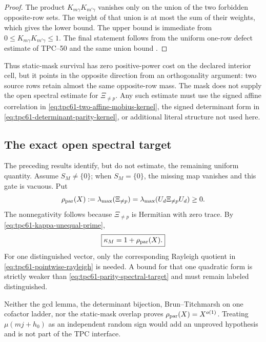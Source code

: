 \begin{proof}
The product \(K_{m\gamma}K_{m'\gamma}\) vanishes only on the union of
the two forbidden opposite-row sets.  The weight of that union is at most
the sum of their weights, which gives the lower bound.  The upper bound is
immediate from \(0\le K_{m\gamma}K_{m'\gamma}\le1\).  The final statement
follows from the uniform one-row defect estimate of TPC--50 and the same
union bound \citep{WangTPC50}.
\end{proof}

Thus static-mask survival has zero positive-power cost on the declared
interior cell, but it points in the opposite direction from an orthogonality
argument: two source rows retain almost the same opposite-row mass.  The
mask does not supply the open spectral estimate for
\(\Xi_{\ne p}\).  Any such estimate must use the signed affine correlation
in \eqref{eq:tpc61-two-affine-mobius-kernel}, the signed determinant form
in \eqref{eq:tpc61-determinant-parity-kernel}, or additional literal
structure not used here.

\subsection{The exact open spectral target}

The preceding results identify, but do not estimate, the remaining
uniform quantity.  Assume \(S_M\ne\{0\}\); when \(S_M=\{0\}\), the
missing map vanishes and this gate is vacuous.  Put
\begin{equation}
 \rho_{\rm par}(X)
 :=\lambda_{\max}(\Xi_{\ne p})
 =\lambda_{\max}(U_d\Xi_{\ne p}U_d)\ge0.
 \label{eq:tpc61-parity-spectral-target}
\end{equation}
The nonnegativity follows because \(\Xi_{\ne p}\) is Hermitian with zero
trace.  By
\eqref{eq:tpc61-kappa-unequal-prime},
\begin{equation}
 \boxed{\kappa_M=1+\rho_{\rm par}(X).}
 \label{eq:tpc61-kappa-parity-target}
\end{equation}
For one distinguished vector, only the corresponding Rayleigh quotient in
\eqref{eq:tpc61-pointwise-rayleigh} is needed.  A bound for that one
quadratic form is strictly weaker than
\eqref{eq:tpc61-parity-spectral-target} and must remain labeled
distinguished.

Neither the gcd lemma, the determinant bijection, Brun--Titchmarsh on one
cofactor ladder, nor the static-mask overlap proves
\(\rho_{\rm par}(X)=X^{o(1)}\).  Treating
\(\mu(mj+h_0)\) as an independent random sign would add an unproved
hypothesis and is not part of the TPC interface.
